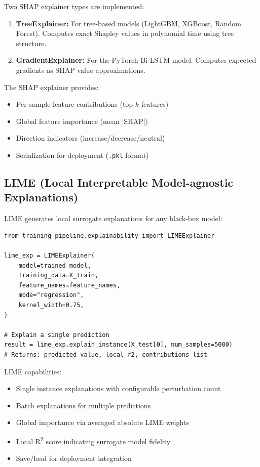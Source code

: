 \documentclass[12pt, a4paper, oneside]{article}
\begin{document}
Two SHAP explainer types are implemented:

\begin{enumerate}
    \item \textbf{TreeExplainer:} For tree-based models (LightGBM, XGBoost, Random Forest). Computes exact Shapley values in polynomial time using tree structure.
    \item \textbf{GradientExplainer:} For the PyTorch Bi-LSTM model. Computes expected gradients as SHAP value approximations.
\end{enumerate}

The SHAP explainer provides:
\begin{itemize}
    \item Per-sample feature contributions (top-$k$ features)
    \item Global feature importance (mean $|$SHAP$|$)
    \item Direction indicators (increase/decrease/neutral)
    \item Serialization for deployment (\texttt{.pkl} format)
\end{itemize}

\subsection{LIME (Local Interpretable Model-agnostic Explanations)}

LIME generates local surrogate explanations for any black-box model:

\begin{lstlisting}[caption={LIME explanation example}]
from training_pipeline.explainability import LIMEExplainer

lime_exp = LIMEExplainer(
    model=trained_model,
    training_data=X_train,
    feature_names=feature_names,
    mode="regression",
    kernel_width=0.75,
)

# Explain a single prediction
result = lime_exp.explain_instance(X_test[0], num_samples=5000)
# Returns: predicted_value, local_r2, contributions list
\end{lstlisting}

LIME capabilities:
\begin{itemize}
    \item Single instance explanations with configurable perturbation count
    \item Batch explanations for multiple predictions
    \item Global importance via averaged absolute LIME weights
    \item Local R\textsuperscript{2} score indicating surrogate model fidelity
    \item Save/load for deployment integration
\end{itemize}
\end{document}
